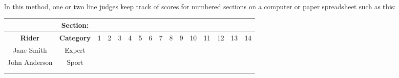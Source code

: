 In this method, one or two line judges keep track of scores for numbered sections on a computer or paper spreadsheet such as this:

\begin{tabular}{|c|c|c|c|c|c|c|c|c|c|c|c|c|c|c|c|}
\hline
 & \textbf{Section:} & & &  & &  &  &  &  &  & & & &  &   \\
\hline
\textbf{Rider} & \textbf{Category} & 1 & 2 & 3 & 4 & 5 & 6 & 7 & 8 & 9 & 10 & 11 & 12 & 13 & 14 \\
\hline
Jane Smith & Expert &  &  &  &  &  &  &  &  &  &  &  &  &  & \\
\hline
John Anderson & Sport &  &  &  &  &  &  &  & &  &  &  &  &  &  \\
\hline
 &  &  &  &  &  &  &  &  &  &  &  &  &  &  & \\
\hline
 &  &  &  &  &  &  &  &  &  &  &  &  &  &  & \\
\hline
\end{tabular}
